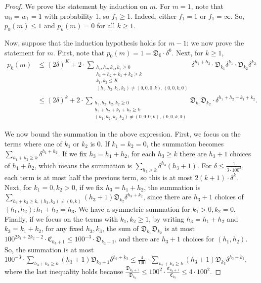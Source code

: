 \documentclass[12pt]{article}
\theoremstyle{definition}
\theoremstyle{remark}
\newcommand{\ten}{100}
\newcommand{\fC}{\mathfrak{C}}
\newcommand{\fD}{\mathfrak{D}}
\begin{document}
\begin{proof}
    We prove the statement by induction on $m$.
    For $m = 1$, note that $w_0 = w_1 = 1$ with probability $1$, so $f_1 \ge 1$. Indeed, either $f_1 = 1$ or $f_1 = \infty$. So, $p_0(m) \le 1$ and $p_k(m) = 0$ for all $k \ge 1$.

    Now, suppose that the induction hypothesis holds for $m-1$: we now prove the statement for $m$. First, note that $p_0(m) = 1 = \fD_0 \cdot \delta^0$. Next, for $k \ge 1$,
\begin{align} \label{eq:pk-bash}
    p_k(m) 
    &\le (2\delta)^{K} + 2 \cdot \sum_{\substack{h_1, h_2, k_2, k_2 \ge 0 \\ h_1+h_2+k_1+k_2 \ge k \\ k_1, k_2 \le K \\ (h_1, h_2, k_1, k_2) \neq (0, 0, 0, k), (0, 0, k, 0)}} \delta^{h_1+h_2} \cdot \fD_{k_1} \delta^{k_1} \cdot \fD_{k_2} \delta^{k_2} \nonumber \\
    &\le (2 \delta)^k + 2 \cdot \sum_{\substack{h_1, h_2, k_2, k_2 \ge 0 \\ h_1+h_2+k_1+k_2 \ge k \\ (h_1, h_2, k_1, k_2) \neq (0, 0, 0, k), (0, 0, k, 0)}} \fD_{k_1} \fD_{k_2} \cdot \delta^{h_1+h_2+k_1+k_2}.
\end{align}

    We now bound the summation in the above expression. First, we focus on the terms where one of $k_1$ or $k_2$ is $0$. If $k_1 = k_2 = 0$, the summation becomes $\sum_{h_1+h_2 \ge k} \delta^{h_1+h_2}$. If we fix $h_3 = h_1+h_2$, for each $h_3 \ge k$ there are $h_3+1$ choices of $h_1+h_2$, which means the summation is $\sum_{h_3 \ge k} \delta^{h_3} (h_3+1)$. For $\delta \le \frac{1}{3 \cdot \ten^3}$, each term is at most half the previous term, so this is at most $2(k+1) \cdot \delta^k$. Next, for $k_1 = 0, k_2 > 0$, if we fix $h_3 = h_1+h_2$, the summation is $\sum_{h_3+k_2 \ge k, (h_3, k_2) \neq (0, k)} (h_3+1) \fD_{k_2} \delta^{h_3+k_2}$, since there are $h_3+1$ choices of $(h_1, h_2): h_1+h_2 = h_3$. We have a symmetric summation for $k_1 > 0, k_2 = 0$. Finally, if we focus on the terms with $k_1, k_2 \ge 1$, by writing $h_3 = h_1+h_2$ and $k_3 = k_1+k_2$, for any fixed $h_3, k_3$, the sum of $\fD_{k_1} \fD_{k_2}$ is at most $\ten^{2k_1+2k_2-2} \cdot \fC_{k_3+1} \le \ten^{-3} \cdot \fD_{k_3+1}$, and there are $h_3+1$ choices for $(h_1, h_2)$. So, the summation is at most $\ten^{-3} \cdot \sum_{h_3+k_3 \ge k} (h_3+1) \fD_{k_3+1} \delta^{h_3+k_3} \le \frac{4}{\ten} \cdot \sum_{h_3+k_3 \ge k} (h_3+1) \fD_{k_3} \delta^{h_3+k_3}$, where the last inequality holds because $\frac{\fD_{k_3+1}}{\fD_{k_3}} \le \ten^2 \cdot \frac{\fC_{k_3+1}}{\fC_{k_3}} \le 4 \cdot \ten^2$.


\end{proof}
\end{document}
